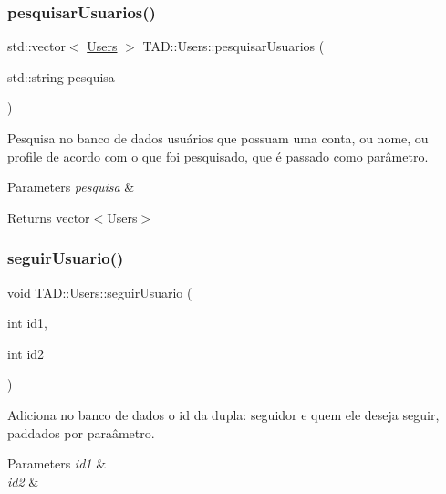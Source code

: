 \subsubsection{\texorpdfstring{pesquisar\+Usuarios()}{pesquisarUsuarios()}}
{\footnotesize\ttfamily std\+::vector$<$ \hyperlink{class_t_a_d_1_1_users}{Users} $>$ T\+A\+D\+::\+Users\+::pesquisar\+Usuarios (\begin{DoxyParamCaption}\item[{std\+::string}]{pesquisa }\end{DoxyParamCaption})}



Pesquisa no banco de dados usuários que possuam uma conta, ou nome, ou profile de acordo com o que foi pesquisado, que é passado como parâmetro. 


\begin{DoxyParams}{Parameters}
{\em pesquisa} & \\
\hline
\end{DoxyParams}
\begin{DoxyReturn}{Returns}
vector$<$\+Users$>$ 
\end{DoxyReturn}
\mbox{\label{class_t_a_d_1_1_users_accb3e1b0025c87abeeda01895a7e3cc2}} 
\subsubsection{\texorpdfstring{seguir\+Usuario()}{seguirUsuario()}}
{\footnotesize\ttfamily void T\+A\+D\+::\+Users\+::seguir\+Usuario (\begin{DoxyParamCaption}\item[{int}]{id1,  }\item[{int}]{id2 }\end{DoxyParamCaption})}



Adiciona no banco de dados o id da dupla\+: seguidor e quem ele deseja seguir, paddados por paraâmetro. 


\begin{DoxyParams}{Parameters}
{\em id1} & \\
\hline
{\em id2} & \\
\hline
\end{DoxyParams}
\mbox{\label{class_t_a_d_1_1_users_a478316bff62d1c33325b29a594a52032}} 
